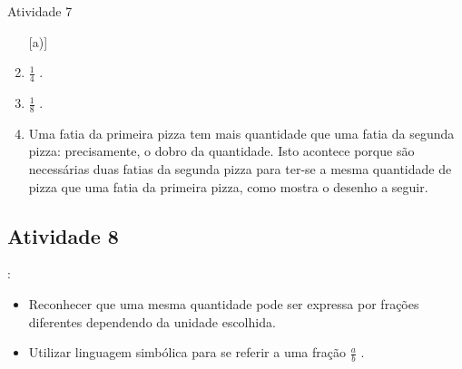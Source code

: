 \documentclass[oneside]{book}
\begin{document}
\begin{multicols}{2}
\begin{resposta*}{Atividade 7}
\begin{enumerate} [\quad a)] %
    \item             $\frac{1}{4}$      .
    \item             $\frac{1}{8}$      .
    \item       Uma fatia da primeira pizza tem mais quantidade que uma fatia da segunda pizza: precisamente, o dobro da quantidade. Isto acontece porque são necessárias duas fatias da segunda pizza para ter-se a mesma quantidade de pizza que uma fatia da primeira pizza, como mostra o desenho a seguir.
\end{enumerate} %
\begin{center}
        \quad \quad
\end{center}
\end{resposta*}





\subsection{Atividade 8}


   \vspace{.1cm}:

  \begin{itemize} %
    \item       Reconhecer que uma mesma quantidade pode ser expressa por frações diferentes dependendo da unidade escolhida.
    \item       Utilizar linguagem simbólica para se referir a uma fração       $\frac{a}{b}$      .
\end{itemize} %


  \vspace{.1cm} 
  

\end{multicols}
\end{document}

